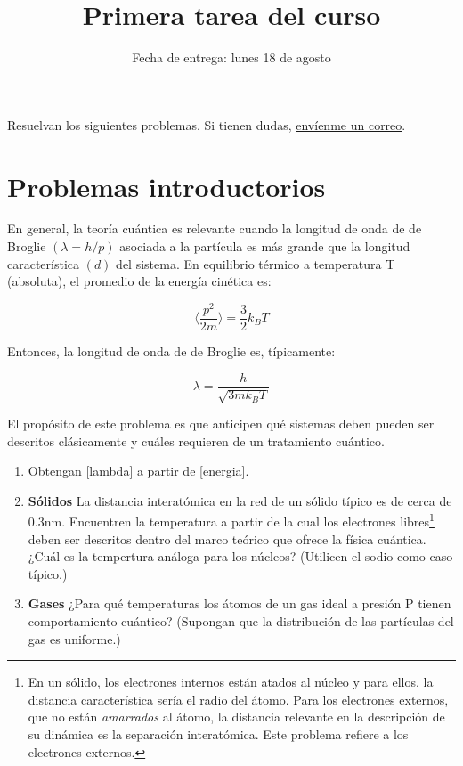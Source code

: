 \documentclass[10pt,letterpaper]{article}
\title{Primera tarea del curso}
\date{Fecha de entrega: lunes 18 de agosto}
\newenvironment{modenumerate}
  {\enumerate\setupmodenumerate}
  {\endenumerate}
\newif\ifmoditem
\newcommand{\setupmodenumerate}{%
  \global\moditemfalse
  \let\origmakelabel\makelabel
  \def\moditem##1{\global\moditemtrue\def\mesymbol{##1}\item}%
  \def\makelabel##1{%
    \origmakelabel{##1\ifmoditem\rlap{\mesymbol}\fi\enspace}%
    \global\moditemfalse}%
}
\begin{document}
\maketitle



\vspace{0.1cm}

Resuelvan los siguientes problemas. Si tienen dudas, \href{mailto:ock.escalera@gmail.com}{envíenme un correo}.


\section{Problemas introductorios}

\begin{modenumerate}

\moditem{*} En general, la teoría cuántica es relevante cuando la longitud de onda de de Broglie $(\lambda=h/p)$ asociada a la partícula es más grande que la longitud característica $(d)$ del sistema. En equilibrio térmico a temperatura T (absoluta), el promedio de la energía cinética es:

\begin{equation}\label{energia}
\langle \frac{p^2}{2m} \rangle = \frac{3}{2}k_BT
\end{equation}

Entonces, la longitud de onda de de Broglie es, típicamente:

\begin{equation}\label{lambda}
\lambda = \frac{h}{\sqrt{3mk_BT}}
\end{equation}

El propósito de este problema es que anticipen qué sistemas deben pueden ser descritos clásicamente y cuáles requieren de un tratamiento cuántico.

\begin{enumerate}
\item Obtengan \eqref{lambda} a partir de \eqref{energia}.
\renewcommand{\theenumi}{\Alph{enumi}}
\item \textbf{Sólidos} La distancia interatómica en la red de un sólido típico es de cerca de 0.3nm. Encuentren la temperatura a partir de la cual los electrones libres\footnote{En un sólido, los electrones internos están atados al núcleo y para ellos, la distancia característica sería el radio del átomo. Para los electrones externos, que no están \emph{amarrados} al átomo, la distancia relevante en la descripción de su dinámica es la separación interatómica. Este problema refiere a los electrones externos.} deben ser descritos dentro del marco teórico que ofrece la física cuántica. ¿Cuál es la tempertura análoga para los núcleos? (Utilicen el sodio como caso típico.)
\item \textbf{Gases} ¿Para qué temperaturas los átomos de un gas ideal a presión P tienen comportamiento cuántico? (Supongan que la distribución de las partículas del gas es uniforme.)
\end{enumerate}


\end{modenumerate}
\end{document}
